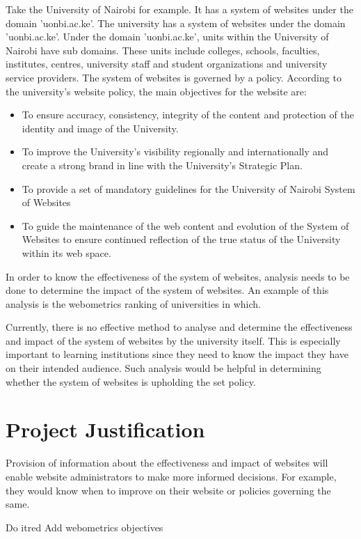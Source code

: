 Take the University of Nairobi for example. It has a system of websites under the domain 'uonbi.ac.ke'. The university has a system of websites under the domain 'uonbi.ac.ke'. Under the domain 'uonbi.ac.ke', units within the  University of Nairobi have sub domains. These units include colleges, schools, faculties, institutes, centres, university staff and student organizations and university service providers. The system of websites is governed by a policy. According to the university's website policy, the main objectives for the website are:
\begin{itemize}
\item To ensure accuracy, consistency, integrity of the content and protection of the identity and image of the University.
\item To improve the University's visibility regionally and internationally and create a strong brand in line with the University's Strategic Plan.
\item To provide a set of mandatory guidelines for the University of Nairobi System of Websites
\item To guide the maintenance of the web content and evolution of the System of Websites to ensure continued reflection of the true status of the University within its web space.
\end{itemize}

In order to know the effectiveness of the system of websites, analysis needs to be done to determine the impact of the system of websites. An example of this analysis is the webometrics ranking of universities in which.

Currently, there is no effective method to analyse and determine the effectiveness and impact of the system of websites by the university itself. This is especially important to learning institutions since they need to know the impact they have on their intended audience.  Such analysis would be helpful in determining whether the system of websites is upholding the set policy.


\section{Project Justification}
Provision of information about the effectiveness and impact of websites will enable website administrators to make more informed decisions. For example, they would know when to improve on their website or policies governing the same.
\begin{review_comment}{Do it}{red}
{Add webometrics objectives}
\end{review_comment}

